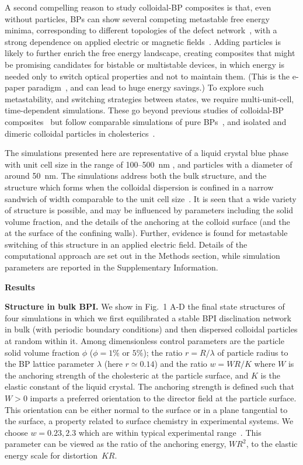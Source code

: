 \documentclass[12pt]{article}
\begin{document}
A second compelling reason to study colloidal-BP composites is that, even without particles, BPs can show several competing metastable free energy minima,
corresponding to different topologies of the defect network~\cite{adriano,fukuda}, with a strong dependence on applied electric or magnetic fields~\cite{henrichfield}.
% 
Adding particles is likely to further enrich the free energy landscape, creating composites that might be promising candidates for bistable or multistable devices, in which energy is needed only to switch optical properties and not to maintain them. (This is the e-paper paradigm~\cite{epaper}, and can lead to huge energy savings.)
To explore such metastability, and switching strategies between states, we require multi-unit-cell, time-dependent simulations. These go beyond previous studies of colloidal-BP composites~\cite{miha} but follow comparable simulations of pure BPs~\cite{bp3,henrichfield,domaingrowth}, and isolated and dimeric colloidal particles in cholesterics~\cite{juho1,juho2}.


The simulations presented here are representative of a liquid crystal
blue phase with unit cell size in the range of 100--500~nm \cite{mermin},
and particles with a diameter of around 50~nm. The simulations
address both the bulk structure, and the structure which forms when
the colloidal dispersion is confined in a narrow sandwich of width
comparable to the unit cell size~\cite{extrareference2}. It is seen
that a wide variety of structure is possible, and may be influenced
by parameters including the solid volume fraction, and the details
of the anchoring at the colloid surface (and the at the surface of the
confining walls). Further, evidence is found for metastable switching of
this structure in an applied electric field. Details of the
computational approach are set out in the Methods section, while
simulation parameters are reported in the Supplementary Information.


\bigskip
\noindent
\textbf{\large Results}

\noindent
\textbf{Structure in bulk BPI.}
We show in Fig.~1 A-D the final state structures of four simulations in which we first equilibrated a stable BPI disclination network in bulk (with periodic boundary conditions) and then dispersed colloidal particles at random within it. Among dimensionless control parameters are the particle solid volume fraction $\phi$  ($\phi = 1\%$ or $5\%$); the ratio $r = R/\lambda$ of particle radius to the BP lattice parameter $\lambda$ (here $r\simeq 0.14$) and the ratio $w = WR/K$ where $W$ is the anchoring strength of the cholesteric at the particle surface, and $K$ is the elastic constant of the liquid crystal.
The anchoring strength is defined such that $W > 0$ imparts a preferred
orientation to the director field at the particle surface. This orientation
can be either normal to the surface or in a plane tangential to the surface,
a property related to surface chemistry in experimental systems.
We choose $w = 0.23, 2.3$ which are within typical experimental range~\cite{tiffany}. This parameter can be viewed as the ratio of the anchoring energy, $WR^2$, to the elastic energy scale for distortion~$KR$. 
\end{document}
